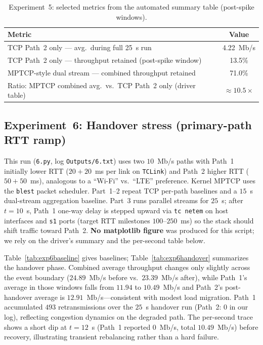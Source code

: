 \begin{table}[htbp]
  \centering
  \caption{Experiment~5: selected metrics from the automated summary table (post-spike windows).}
  \label{tab:exp5}
  \begin{tabular}{lc}
    \toprule
    Metric & Value \\
    \midrule
    TCP Path~2 only --- avg.\ during full 25~s run & 4.22~Mb/s \\
    TCP Path~2 only --- throughput retained (post-spike window) & 13.5\% \\
    MPTCP-style dual stream --- combined throughput retained & 71.0\% \\
    Ratio: MPTCP combined avg.\ vs.\ TCP Path~2 only (driver table) & $\approx 10.5{\times}$ \\
    \bottomrule
  \end{tabular}
\end{table}

\subsection{Experiment~6: Handover stress (primary-path RTT ramp)}
\label{subsec:exp6}

This run (\texttt{6.py}, log \texttt{Outputs/6.txt}) uses two $10$~Mb/s paths with Path~1 initially lower RTT ($20{+}20$~ms per link on \texttt{TCLink}) and Path~2 higher RTT ($50{+}50$~ms), analogous to a ``Wi-Fi'' vs.\ ``LTE'' preference. Kernel MPTCP uses the \texttt{blest} packet scheduler. Part~1--2 repeat TCP per-path baselines and a $15$~s dual-stream aggregation baseline. Part~3 runs parallel streams for $25$~s; after $t=10$~s, Path~1 one-way delay is stepped upward via \texttt{tc netem} on host interfaces and \texttt{s1} ports (target RTT milestones $100$--$250$~ms) so the stack should shift traffic toward Path~2. \textbf{No matplotlib figure} was produced for this script; we rely on the driver's summary and the per-second table below.

Table~\ref{tab:exp6baseline} gives baselines; Table~\ref{tab:exp6handover} summarizes the handover phase. Combined average throughput changes only slightly across the event boundary ($24.89$~Mb/s before vs.\ $23.39$~Mb/s after), while Path~1's average in those windows falls from $11.94$ to $10.49$~Mb/s and Path~2's post-handover average is $12.91$~Mb/s---consistent with modest load migration. Path~1 accumulated $493$ retransmissions over the $25$~s handover run (Path~2: $0$ in our log), reflecting congestion dynamics on the degraded path. The per-second trace shows a short dip at $t{=}12$~s (Path~1 reported $0$~Mb/s, total $10.49$~Mb/s) before recovery, illustrating transient rebalancing rather than a hard failure.

